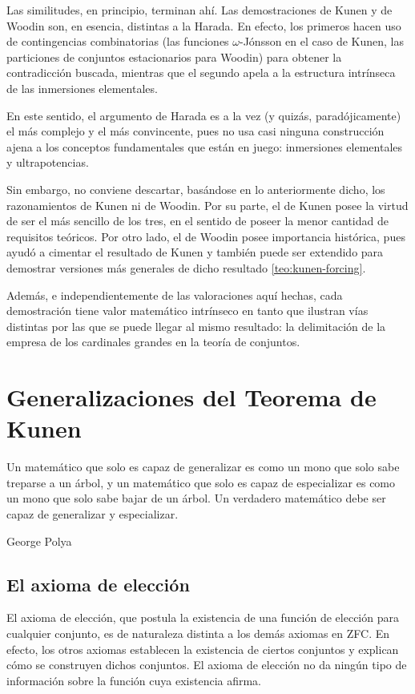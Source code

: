Las similitudes, en principio, terminan ahí. Las demostraciones de Kunen
y de Woodin son, en esencia, distintas a la Harada.
En efecto, los primeros hacen uso de contingencias combinatorias
(las funciones $\omega$-Jónsson en el caso de Kunen,
las particiones de conjuntos estacionarios para Woodin)
para obtener la contradicción buscada, mientras que el segundo
apela a la estructura intrínseca de las inmersiones elementales.

En este sentido, el argumento de Harada es a la vez (y quizás, paradójicamente)
el más complejo y el más convincente, pues no usa casi ninguna construcción
ajena a los conceptos fundamentales que están en juego: inmersiones elementales
y ultrapotencias.

Sin embargo, no conviene descartar, basándose en lo anteriormente dicho,
los razonamientos de Kunen ni de Woodin. Por su parte, el de Kunen posee
la virtud de ser el más sencillo de los tres, en el sentido de poseer
la menor cantidad de requisitos teóricos. Por otro lado, el de Woodin
posee importancia histórica, pues ayudó a cimentar el resultado
de Kunen y también puede ser extendido para demostrar versiones
más generales de dicho resultado \ref{teo:kunen-forcing}.

Además, e independientemente de las valoraciones aquí hechas,
cada demostración tiene valor matemático intrínseco en tanto
que ilustran vías distintas por las que se puede llegar al mismo
resultado: la delimitación de la empresa de los cardinales grandes
en la teoría de conjuntos.

\chapter{Generalizaciones del Teorema de Kunen}
\thispagestyle{empty}

\epigraph
{
    Un matemático que solo es capaz de generalizar es como
    un mono que solo sabe treparse a un árbol, y un matemático
    que solo es capaz de especializar es como un mono que solo
    sabe bajar de un árbol. Un verdadero matemático debe ser
    capaz de generalizar y especializar.
}
{George Polya \autocite[139]{machale_comic_1993}}

\section{El axioma de elección}

El axioma de elección, que postula la existencia
de una función de elección para cualquier conjunto,
es de naturaleza distinta a los demás axiomas en ZFC.
En efecto, los otros axiomas establecen la existencia
de ciertos conjuntos y explican cómo se construyen dichos
conjuntos. El axioma de elección no da ningún tipo de información
sobre la función cuya existencia afirma.

